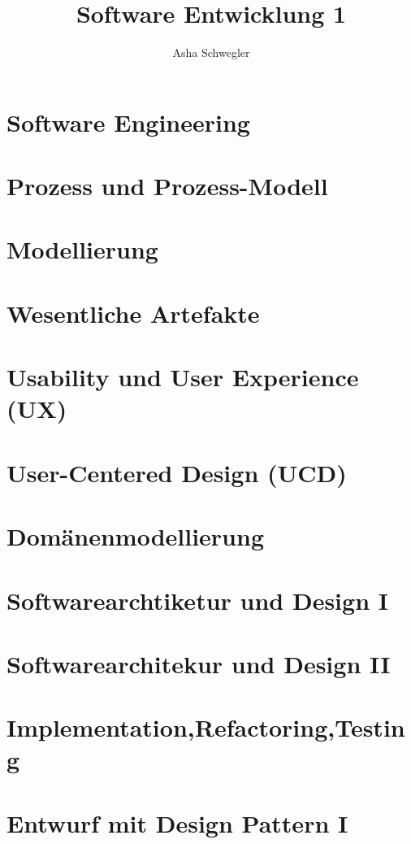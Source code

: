 \documentclass{article}
\title{Software Entwicklung 1}
\author{Asha Schwegler}
\begin{document}
\maketitle
\tableofcontents
\newpage


\section{Software Engineering}





\section{Prozess und Prozess-Modell}



\section{Modellierung}


\section{Wesentliche Artefakte}



\section{Usability und User Experience (UX)}


\section{User-Centered Design (UCD)}




\section{Domänenmodellierung}




\section{Softwarearchtiketur und Design I}


\section{Softwarearchitekur und Design II}




\section{Implementation,Refactoring,Testing}


\section{Entwurf mit Design Pattern I}

\end{document}
